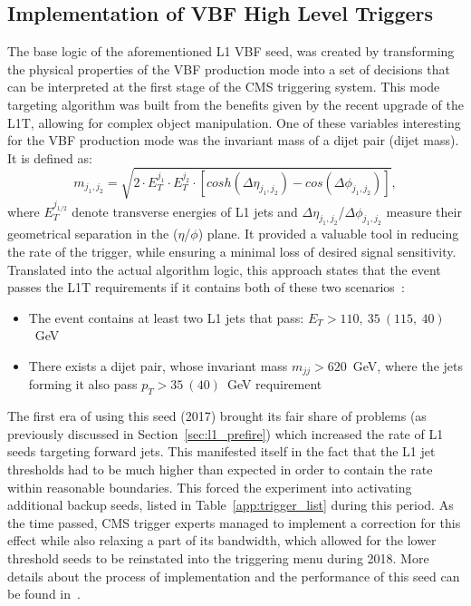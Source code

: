 \subsection{Implementation of VBF High Level Triggers}
\label{sec:vbf_implementation}
\hspace{10pt} The base logic of the aforementioned L1 VBF seed, was created by transforming the physical properties of the VBF production mode into a set of decisions that can be interpreted at the first stage of the CMS triggering system. This mode targeting algorithm was built from the benefits given by the recent upgrade of the L1T, allowing for complex object manipulation. One of these variables interesting for the VBF production mode was the invariant mass of a dijet pair (dijet mass). It is defined as:
\begin{equation}
    m_{j_1,j_2} = \sqrt{2\cdot E_T^{j_1}\cdot E_T^{j_2}\cdot [cosh(\Delta\eta_{j_1,j_2})-cos(\Delta\phi_{j_1,j_2})]},
\end{equation}
where $E_T^{j_{1/2}}$ denote transverse energies of L1 jets and $\Delta\eta_{j_1,j_2}$/$\Delta\phi_{j_1,j_2}$ measure their geometrical separation in the ($\eta$/$\phi$) plane. It provided a valuable tool in reducing the rate of the trigger, while ensuring a minimal loss of desired signal sensitivity. Translated into the actual algorithm logic, this approach states that the event passes the L1T requirements if it contains both of these two scenarios~\cite{cms:l1_paper}:
\begin{itemize}
    \item The event contains at least two L1 jets that pass: $E_T > 110,~35~(115,~40)$~GeV
    \item There exists a dijet pair, whose invariant mass $m_{jj}  > 620$~GeV, where the jets forming it also pass $p_T > 35~(40)$~GeV requirement
\end{itemize}
The first era of using this seed (2017) brought its fair share of problems (as previously discussed in Section~\ref{sec:l1_prefire}) which increased the rate of L1 seeds targeting forward jets. This manifested itself in the fact that the L1 jet thresholds had to be much higher than expected in order to contain the rate within reasonable boundaries. This forced the experiment into activating additional backup seeds, listed in Table~\ref{app:trigger_list} during this period. As the time passed, CMS trigger experts managed to implement a correction for this effect while also relaxing a part of its bandwidth, which allowed for the lower threshold seeds to be reinstated into the triggering menu during 2018. More details about the process of implementation and the performance of this seed can be found in~\cite{cms:l1_paper,Chiara}.


